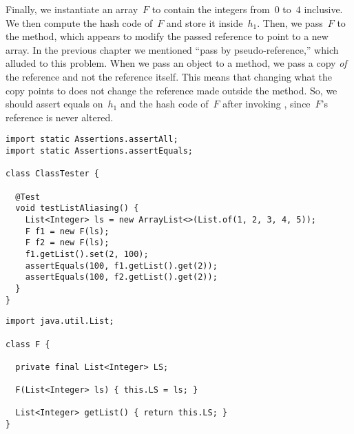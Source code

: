 Finally, we instantiate an array~$F$ to contain the integers from~$0$ to~$4$ inclusive. We then compute the hash code of~$F$ and store it inside~$h_1$. Then, we pass~$F$ to the  method, which appears to modify the passed reference to point to a new array. In the previous chapter we mentioned ``pass by pseudo-reference,'' which alluded to this problem. When we pass an object to a method, we pass a copy \emph{of} the reference and not the reference itself. This means that changing what the copy points to does not change the reference made outside the method. So, we should assert equals on~$h_1$ and the hash code of~$F$ after invoking , since~$F$'s reference is never altered.


\begin{lstlisting}[language=MyJava]
import static Assertions.assertAll;
import static Assertions.assertEquals;

class ClassTester {

  @Test
  void testListAliasing() {
    List<Integer> ls = new ArrayList<>(List.of(1, 2, 3, 4, 5));
    F f1 = new F(ls);
    F f2 = new F(ls);
    f1.getList().set(2, 100);
    assertEquals(100, f1.getList().get(2));
    assertEquals(100, f2.getList().get(2));
  }
}
\end{lstlisting}

\begin{lstlisting}[language=MyJava]
import java.util.List;

class F {
  
  private final List<Integer> LS;
  
  F(List<Integer> ls) { this.LS = ls; }
  
  List<Integer> getList() { return this.LS; }
}
\end{lstlisting}


